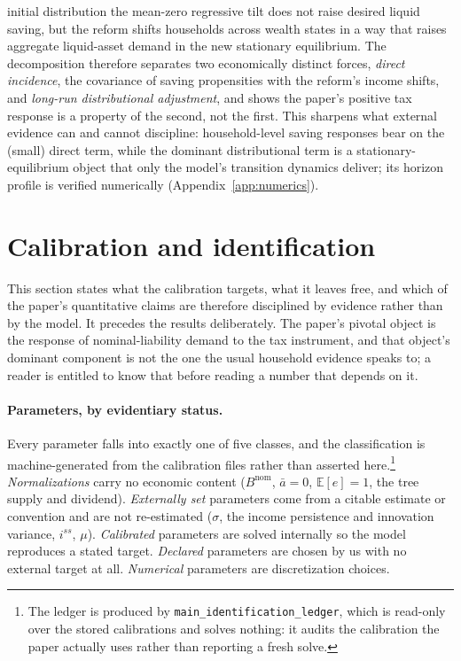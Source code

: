 \documentclass[12pt]{article}
\makeatletter
\newcommand{\FloatBarrier}{\par
    \begingroup\let\@elt\relax
    \edef\reserved@a{\@deferlist}\endgroup
    \ifx\reserved@a\@empty\else\clearpage\fi}
\makeatother
\begin{document}
initial distribution the mean-zero regressive tilt does not raise desired
liquid saving, but the reform shifts households across wealth states in a
way that raises aggregate liquid-asset demand in the new stationary
equilibrium. The decomposition therefore separates two economically distinct
forces, \emph{direct incidence}, the covariance of saving propensities
with the reform's income shifts, and \emph{long-run distributional
adjustment}, and shows the paper's positive tax response is a property of
the second, not the first. This sharpens what external evidence can and
cannot discipline: household-level saving responses bear on the (small)
direct term, while the dominant distributional term is a
stationary-equilibrium object that only the model's transition dynamics
deliver; its horizon profile is verified numerically
(Appendix~\ref{app:numerics}).

\FloatBarrier
\section{Calibration and identification}\label{sec:identification}

This section states what the calibration targets, what it leaves free, and
which of the paper's quantitative claims are therefore disciplined by
evidence rather than by the model. It precedes the results deliberately. The
paper's pivotal object is the response of nominal-liability demand to the tax
instrument, and that object's dominant component is not the one the usual
household evidence speaks to; a reader is entitled to know that before
reading a number that depends on it.

\paragraph{Parameters, by evidentiary status.} Every parameter falls into
exactly one of five classes, and the classification is machine-generated from
the calibration files rather than asserted here.\footnote{The ledger is
produced by \texttt{main\_identification\_ledger}, which is read-only over the
stored calibrations and solves nothing: it audits the calibration the paper
actually uses rather than reporting a fresh solve.} \emph{Normalizations}
carry no economic content ($B^{\text{nom}}$, $\bar a=0$, $\mathbb{E}[e]=1$,
the tree supply and dividend). \emph{Externally set} parameters come from a
citable estimate or convention and are not re-estimated ($\sigma$, the income
persistence and innovation variance, $i^{ss}$, $\mu$). \emph{Calibrated}
parameters are solved internally so the model reproduces a stated target.
\emph{Declared} parameters are chosen by us with no external target at all.
\emph{Numerical} parameters are discretization choices.
\end{document}
